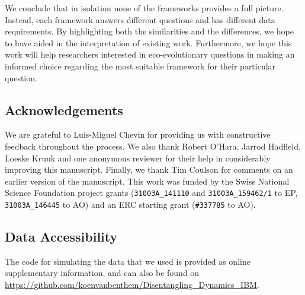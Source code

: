We conclude that in isolation none of the frameworks provides a full picture. Instead, each framework answers different questions and has different data requirements. By highlighting both the similarities and the differences, we hope to have aided in the interpretation of existing work. Furthermore, we hope this work will help researchers interested in eco-evolutionary questions in making an informed choice regarding the most suitable framework for their particular question.

\subsection*{Acknowledgements}
We are grateful to Luis-Miguel Chevin for providing us with constructive feedback throughout the process. We also thank Robert O'Hara, Jarrod Hadfield, Loeske Kruuk and one anonymous reviewer for their help in considerably improving this manuscript. Finally, we thank Tim Coulson for comments on an earlier version of the manuscript.  This work was funded by the Swiss National Science Foundation project grants (\verb|31003A_141110| and \verb|31003A_159462/1| to EP, \verb|31003A_146445| to AO) and an ERC starting grant (\verb|#337785| to AO).

\subsection*{Data Accessibility}
The code for simulating the data that we used is provided as online supplementary information, and can also be found on  \url{https://github.com/koenvanbenthem/Disentangling_Dynamics_IBM}. 
\printbibliography[heading=subbibliography]
